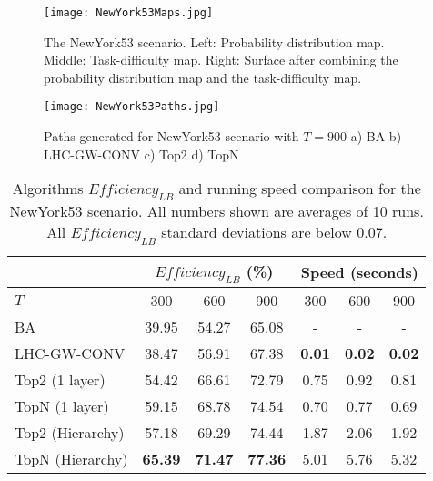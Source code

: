 \begin{figure}
\centering
\texttt{[image: NewYork53Maps.jpg]}
\caption[The NewYork53 scenario]{The NewYork53 scenario. Left: Probability distribution map. Middle: Task-difficulty map. Right: Surface after combining the probability distribution map and the task-difficulty map.}
\label{NewYork53Maps}
\end{figure}
\begin{figure}
\centering
\texttt{[image: NewYork53Paths.jpg]}
\caption[Paths generated for NewYork53 scenario with $T=900$]{Paths generated for NewYork53 scenario with $T=900$ a) BA b) LHC-GW-CONV c) Top2 d) TopN}
\label{NewYork53Paths}
\end{figure}
\begin{table}
\caption[Algorithms $\mathit{Efficiency_{LB}}$ and running speed comparison for the NewYork53 scenario]{Algorithms $\mathit{Efficiency_{LB}}$ and running speed comparison for the NewYork53 scenario. All numbers shown are averages of 10 runs. All $\mathit{Efficiency_{LB}}$ standard deviations are below 0.07.}
	\centering
		\begin{tabular}
			{|l|c|c|c|c|c|c|}
			\hline
			 & \multicolumn{3}{|c|}{$\mathit{Efficiency_{LB}}$ (\%)} & \multicolumn{3}{|c|}{Speed (seconds)} \\
			\hline
			$T$ & 300 & 600 & 900	& 300 & 600 & 900 \\
			\hline
			BA & 39.95 & 54.27 & 65.08 & - & - & - \\
			\hline			
			LHC-GW-CONV & 38.47 & 56.91 & 67.38 & \textbf{0.01} & \textbf{0.02} & \textbf{0.02} \\
			\hline			
			Top2 (1 layer)	& 54.42 & 66.61 & 72.79 & 0.75 & 0.92 & 0.81 \\ 
			\hline
			TopN (1 layer)	& 59.15 & 68.78 & 74.54 & 0.70 & 0.77 & 0.69 \\ 
			\hline
			Top2 (Hierarchy) & 57.18 & 69.29 & 74.44 & 1.87 & 2.06 & 1.92 \\ 
			\hline
			TopN (Hierarchy) & \textbf{65.39} & \textbf{71.47} & \textbf{77.36} & 5.01 & 5.76 & 5.32 \\ 
			\hline			
		\end{tabular}
\label{NewYork53}
\end{table}

